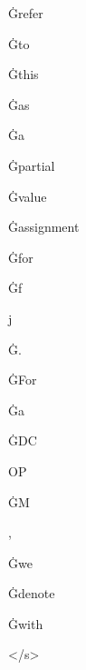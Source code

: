 \documentclass[varwidth]{standalone}
\begin{document}
\begin{CJK*}{UTF8}{gbsn}
{{{\colorbox{red!0.32840967}{\strut Ġrefer} \colorbox{red!0.030328415}{\strut Ġto} \colorbox{red!0.104811355}{\strut Ġthis} \colorbox{red!0.13071494}{\strut Ġas} \colorbox{red!0.10352676}{\strut Ġa} \colorbox{red!0.21521197}{\strut Ġpartial} \colorbox{red!0.0897707}{\strut Ġvalue} \colorbox{red!0.2043823}{\strut Ġassignment} \colorbox{red!0.09214062}{\strut Ġfor} \colorbox{red!0.040781006}{\strut Ġf} \colorbox{red!0.036711596}{\strut j} \colorbox{red!0.13380484}{\strut Ġ.} \colorbox{red!0.11748376}{\strut ĠFor} \colorbox{red!0.16157421}{\strut Ġa} \colorbox{red!0.04931242}{\strut ĠDC} \colorbox{red!0.03780802}{\strut OP} \colorbox{red!0.16134812}{\strut ĠM} \colorbox{red!0.14627644}{\strut ,} \colorbox{red!0.10237929}{\strut Ġwe} \colorbox{red!0.4208795}{\strut Ġdenote} \colorbox{red!0.15234306}{\strut Ġwith} \colorbox{red!0.14592071}{\strut </s>} 
}}}
\end{CJK*}
\end{document}
